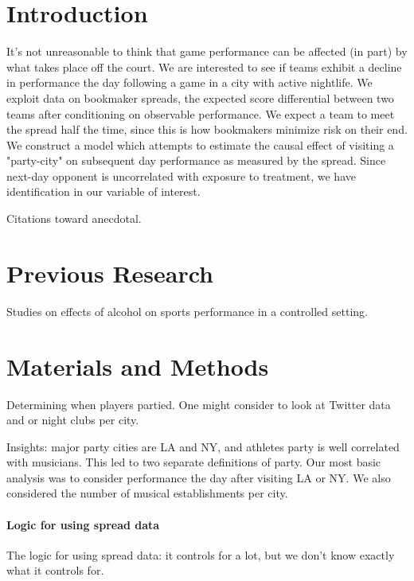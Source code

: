 \documentclass[letterpaper,12pt]{article}
\begin{document}

\section{Introduction}
It's not unreasonable to think that game performance can be affected 
(in part) by what takes place off the court. We are interested to see if 
teams exhibit a decline in performance the day following a game in a city 
with active nightlife. We exploit data on bookmaker spreads, the expected score 
differential between two teams after conditioning on observable performance. 
We expect a team to meet the spread half the time, since this is how bookmakers 
minimize risk on their end. We construct a model which attempts to 
estimate the causal effect of  visiting a "party-city" on subsequent day 
performance as measured by the spread. Since next-day
opponent is uncorrelated with exposure to treatment, we have identification in our variable of 
interest.

Citations toward anecdotal. %

\section{Previous Research}
Studies on effects of alcohol on sports performance in a controlled setting.

\section{Materials and Methods}
Determining when players partied. One might consider to look at Twitter data
and or night clubs per city. 

Insights: major party cities are LA and NY, and athletes party is well correlated with musicians. This led to two separate definitions of party. Our most basic analysis was to consider performance 
the day after visiting LA or NY.
We also considered the number of musical establishments per city. 

\paragraph{Logic for using spread data}
The logic for using spread data: it controls for a lot, but we don't know exactly
what it controls for.
\end{document}

